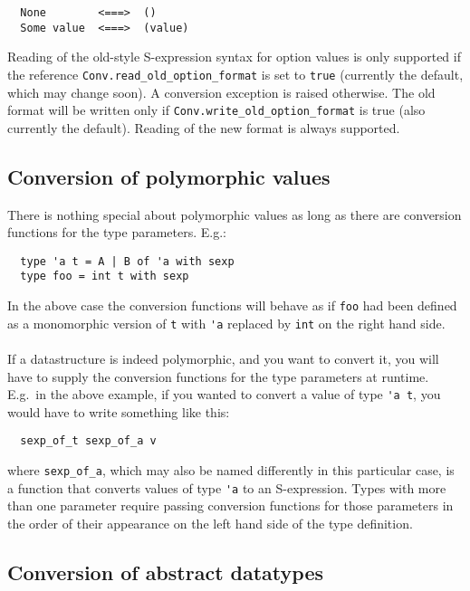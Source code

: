 \documentclass[a4paper]{article}
\begin{document}
\begin{verbatim}
  None        <===>  ()
  Some value  <===>  (value)
\end{verbatim}

Reading of the old-style S-expression syntax for option values is only
supported if the reference \verb=Conv.read_old_option_format= is set to
\verb=true= (currently the default, which may change soon).  A conversion
exception is raised otherwise.  The old format will be written only if
\verb=Conv.write_old_option_format= is true (also currently the default).
Reading of the new format is always supported.

\subsection{Conversion of polymorphic values}

There is nothing special about polymorphic values as long as there are
conversion functions for the type parameters.  E.g.:

\begin{verbatim}
  type 'a t = A | B of 'a with sexp
  type foo = int t with sexp
\end{verbatim}

In the above case the conversion functions will behave as if \verb=foo=
had been defined as a monomorphic version of \verb=t= with \verb='a=
replaced by \verb=int= on the right hand side.\\
\\
If a datastructure is indeed polymorphic, and you want to convert it,
you will have to supply the conversion functions for the type parameters
at runtime.  E.g.\ in the above example, if you wanted to convert a value
of type \verb='a t=, you would have to write something like this:

\begin{verbatim}
  sexp_of_t sexp_of_a v
\end{verbatim}

\noindent where \verb=sexp_of_a=, which may also be named differently in
this particular case, is a function that converts values of type \verb='a=
to an S-expression.  Types with more than one parameter require passing
conversion functions for those parameters in the order of their appearance
on the left hand side of the type definition.

\subsection{Conversion of abstract datatypes}
\end{document}
